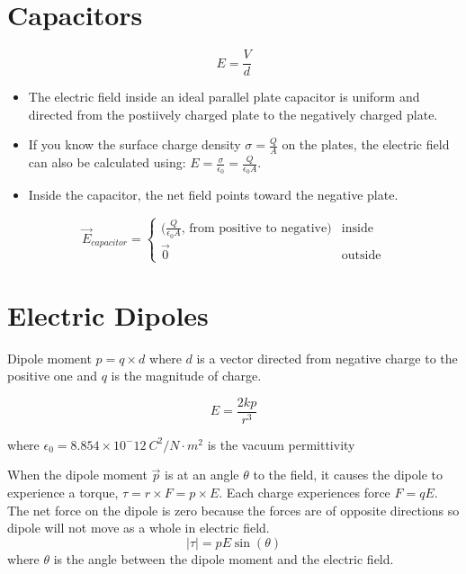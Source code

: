 \documentclass{article}
\begin{document}
\section*{Capacitors}

\[E=\frac{V}{d}\]

\begin{itemize}
    \item The electric field inside an ideal parallel plate capacitor is uniform and directed from
    the postiively charged plate to the negatively charged plate.
    \item If you know the surface charge density $\sigma=\frac{Q}{A}$ on the plates, the electric
    field can also be calculated using: $E=\frac{\sigma}{\epsilon_0}=\frac{Q}{\epsilon_0 A}$.
    \item Inside the capacitor, the net field points toward the negative plate.
\end{itemize}

\[\vec{E}_{capacitor}=\begin{cases}
\big(\frac{Q}{\epsilon_0 A}\text{, from positive to negative}\big) & \text{inside} \\ 
\vec{0} & \text{outside}
\end{cases}\]

\section*{Electric Dipoles}
Dipole moment $p=q\times d$ where $d$ is a vector directed from negative charge to the positive one
and $q$ is the magnitude of charge.

\[E=\frac{2kp}{r^3}\]

where $\epsilon_0=8.854\times 10^-12\: C^2 / N\cdot m^2$ is the vacuum permittivity

When the dipole moment $\vec{p}$ is at an angle $\theta$ to the field, it causes the dipole to
experience a torque, $\tau = r\times F = p\times E$. Each charge experiences force $F=qE$. The net
force on the
dipole is zero because the forces are of opposite directions so dipole will not move as a whole in
electric field.
\[|\tau | = pE\sin (\theta)\] where $\theta$ is the angle between the dipole moment and the
electric field.
\end{document}
